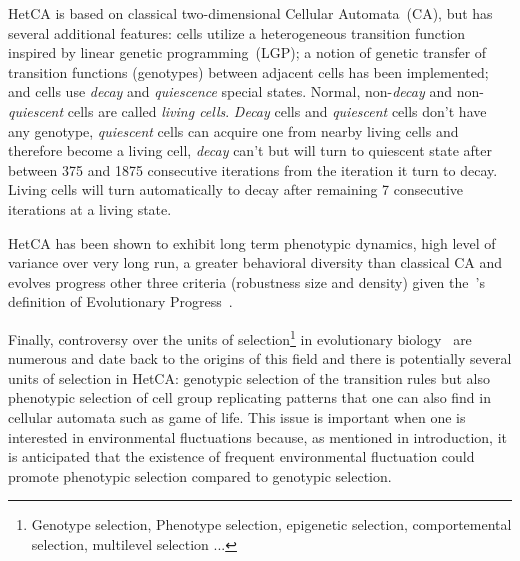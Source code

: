 HetCA is based on classical two-dimensional Cellular Automata~(CA), but has several additional features: cells utilize a heterogeneous transition function inspired by linear genetic programming~(LGP); a notion of genetic transfer of transition functions (genotypes) between adjacent cells has been implemented; and cells use \emph{decay} and \emph{quiescence} special states. Normal, non-\emph{decay} and non-\emph{quiescent} cells are called \emph{living cells}. \emph{Decay} cells and \emph{quiescent} cells don't have any genotype, \emph{quiescent} cells can acquire one from nearby living cells and therefore become a living cell, \emph{decay} can't but will turn to quiescent state after between 375 and 1875 consecutive iterations from the iteration it turn to decay. Living cells will turn automatically to decay after remaining 7 consecutive iterations at a living state. 

HetCA has been shown to exhibit long term phenotypic dynamics, high level of variance over very long run, a greater behavioral diversity than classical CA and evolves progress other three criteria (robustness size and density) given the~\cite{shanahan2012evolutionary}'s definition of Evolutionary Progress~\citep{medernach2015evolutionary}.


Finally, controversy over the units of selection\footnote{Genotype selection, Phenotype selection, epigenetic selection, comportemental selection, multilevel selection \cite{lloyd2012unitsandlevelsofselection}...} in evolutionary biology~\citep{okasha2006evolution} are numerous and date back to the origins of this field  and there is potentially several units of selection in HetCA: genotypic selection of the transition rules but also phenotypic selection of cell group replicating patterns that one can also find in cellular automata such as game of life.  This issue is important when one is interested in environmental fluctuations because, as mentioned in introduction, it is anticipated that the existence of frequent environmental fluctuation could promote phenotypic selection compared to genotypic selection.



